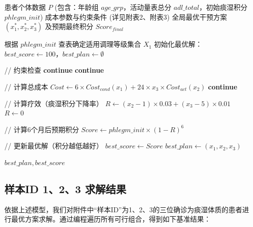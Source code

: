 \documentclass[12pt,a4paper]{article}
\begin{document}
\begin{algorithm}[H]
\caption{静态基准方案穷举搜索模型}
\label{alg:static_exhaustive}
\begin{algorithmic}[1]
\REQUIRE 患者个体数据 $P$ (包含：年龄组 $age\_grp$，活动量表总分 $adl\_total$，初始痰湿积分 $phlegm\_init$)
\REQUIRE 成本参数与约束条件 (详见附表2、附表3)
\ENSURE 全局最优干预方案 $(x_1^*, x_2^*, x_3^*)$ 及预期最终积分 $Score_{final}$

\STATE 根据 $phlegm\_init$ 查表确定适用调理等级集合 $X_1$
\STATE 初始化最优解：$best\_score \gets 100$，$best\_plan \gets \emptyset$

            \STATE // 约束检查
                \STATE \textbf{continue}
            \ENDIF
                \STATE \textbf{continue}
            \ENDIF
            
            \STATE // 计算总成本
            \STATE $Cost \gets 6 \times Cost_{cond}(x_1) + 24 \times x_3 \times Cost_{act}(x_2)$
                \STATE \textbf{continue}
            \ENDIF
            
            \STATE // 计算疗效（痰湿积分下降率）
                \STATE $R \gets (x_2 - 1) \times 0.03 + (x_3 - 5) \times 0.01$
            \ELSE
                \STATE $R \gets 0$
            \ENDIF
            
            \STATE // 计算6个月后预期积分
            \STATE $Score \gets phlegm\_init \times (1 - R)^6$
            
            \STATE // 更新最优解（积分越低越好）
                \STATE $best\_score \gets Score$
                \STATE $best\_plan \gets (x_1, x_2, x_3)$
            \ENDIF
        \ENDFOR
    \ENDFOR
\ENDFOR

\RETURN $best\_plan, best\_score$
\end{algorithmic}
\end{algorithm}

\subsection{样本ID 1、2、3 求解结果}
依据上述模型，我们对附件中“样本ID”为1、2、3的三位确诊为痰湿体质的患者进行最优方案求解。通过编程遍历所有可行组合，得到如下基准结果：
\end{document}
